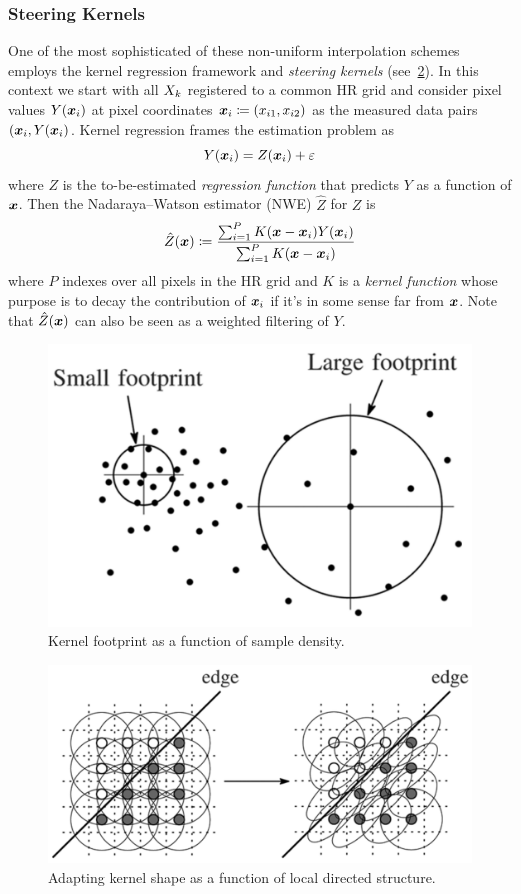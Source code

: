\subsubsection{Steering Kernels}
One of the most sophisticated of these non-uniform interpolation schemes employs the kernel regression framework and \textit{steering kernels} (see~\ref{fig:steering}).
%
In this context we start with all \(X_k\) registered to a common HR grid and consider pixel values \(Y(\bm{x}_i)\) at pixel coordinates \(\bm{x}_i \coloneqq (x_{i1},x_{i2})\) as the measured data pairs \((\bm{x}_i, Y(\bm{x}_i)\).
%
Kernel regression frames the estimation problem as
\begin{equation}
	Y(\bm{x}_i) = Z(\bm{x}_i) + \varepsilon
\end{equation}
where \(Z\) is the to-be-estimated \textit{regression function} that predicts \(Y\) as a function of \(\bm{x}\).
Then the Nadaraya–Watson estimator (NWE)\cite{Nadaraya} \(\hat{Z}\) for \(Z\) is
\begin{equation}
	\hat{Z}(\bx) \coloneqq \frac{\sum_{i=1}^{P}K(\delx)Y(\bxi)}{\sum_{i=1}^{P}K(\delx)}
	\label{eqn:kernelregression}
\end{equation}
where \(P\) indexes over all pixels in the HR grid and \(K\) is a \textit{kernel function} whose purpose is to decay the contribution of \(\bm{x}_i\) if it's in some sense far from \(\bm{x}\).
%
Note that \(\hat{Z}(\bm{x})\) can also be seen as a weighted filtering of \(Y\).
%
\begin{figure}
	\centering
	\includegraphics[width=.8\linewidth]{figures/classical/footprint.png}
	\caption{Kernel footprint as a function of sample density\cite{Takeda2007}.}
	\label{fig:footprint}
\end{figure}
\begin{figure}
	\centering
	\includegraphics[width=\linewidth,keepaspectratio]{figures/classical/steering.png}
	\caption{Adapting kernel shape as a function of local directed structure\cite{Takeda2007}.}
	\label{fig:steering}
\end{figure}
